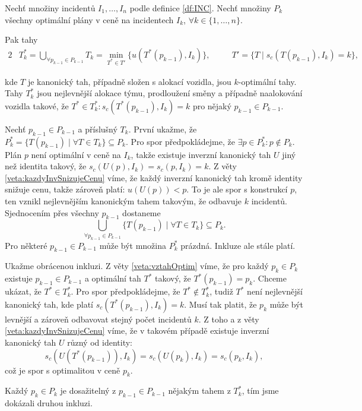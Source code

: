\begin{veta}\label{veta:konkrOptTahy}
  Nechť množiny incidentů $I_1, \dots, I_n$ podle definice \ref{df:INC}.
  Nechť množiny $P_{k}$ všechny optimální plány v ceně na incidentech $I_k$, $\forall k \in \{ 1, \dots, n \}$.

  Pak tahy 
  \begin{alignat*}{2}
    & T^*_k = \bigcup_{\forall p_{k-1} \in P_{k-1}} T_k = \min_{T^* \in T'} \{ u(T^*(p_{k-1}), I_k) \}, \quad && T' = \{ T \mid s_c(T(p_{k-1}), I_k) = k \},
  \end{alignat*}

  kde $T$ je kanonický tah, případně složen s alokací vozidla, jsou $k$-optimální tahy.
  Tahy $T^*_k$ jsou nejlevnější alokace týmu, prodloužení směny a případně naalokování vozidla takové,
  že $T^* \in T^*_k \colon s_c(T^*(p_{k-1}), I_k) = k$ pro nějaký $p_{k-1} \in P_{k-1}$.
\end{veta}
\begin{dukaz}
  Nechť $p_{k-1} \in P_{k-1}$ a příslušný $T_k$. První ukažme, že $P^*_k = \{ T(p_{k-1}) \mid \forall T \in T_k \} \subseteq P_k$.
  Pro spor předpokládejme, že $\exists p \in P^*_k \colon p \not \in P_k$.
  Plán $p$ není optimální v ceně na $I_k$, takže existuje inverzní kanonický tah $U$ jiný než identita takový, že $s_c(U(p), I_k) = s_c(p, I_k) = k$.
  Z věty \ref{veta:kazdyInvSnizujeCenu} víme, že každý inverzní kanonický tah kromě identity snižuje cenu, takže zároveň platí: $u(U(p)) < p$.
  To je ale spor s konstrukcí $p$, ten vznikl nejlevnějším kanonickým tahem takovým, že odbavuje $k$ incidentů.
  Sjednocením přes všechny $p_{k-1}$ dostaneme 
  \begin{equation*}
    \bigcup_{\forall p_{k-1} \in P_{k-1}} \{ T(p_{k-1}) \mid \forall T \in T_k \} \subseteq P_k.
  \end{equation*}
  Pro některé $p_{k-1} \in P_{k-1}$ může být množina $P^*_{k}$ prázdná. Inkluze ale stále platí.

  Ukažme obrácenou inkluzi. Z věty \ref{veta:vztahOptim} víme, že pro každý $p_k \in P_k$ existuje $p_{k-1} \in P_{k-1}$ a optimální tah $T^*$ takový,
  že $T^*(p_{k-1}) = p_k$. Chceme ukázat, že $T^* \in T^*_k$.
  Pro spor předpokládejme, že $T^* \not \in T^*_k$, tudiž $T^*$ není nejlevnější kanonický tah, kde platí $s_c(T^*(p_{k-1}), I_k) = k$.
  Musí tak platit, že $p_k$ může být levnější a zároveň odbavovat stejný počet incidentů $k$. 
  Z toho a z věty \ref{veta:kazdyInvSnizujeCenu} víme, že v takovém případě existuje inverzní kanonický tah $U$ různý od identity:
  \begin{equation*}
    s_c(U(T^*(p_{k-1})), I_k) = s_c(U(p_k), I_k) = s_c(p_k, I_k),
  \end{equation*}
  což je spor s optimalitou v ceně $p_k$.

  Každý $p_k \in P_k$ je dosažitelný z $p_{k-1} \in P_{k-1}$ nějakým tahem z $T^*_k$, tím jsme dokázali druhou inkluzi.
\end{dukaz}

